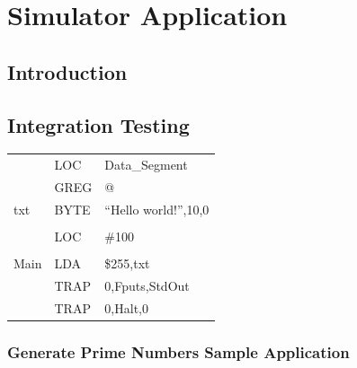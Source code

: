 \documentclass[a4paper,11pt]{report}
\begin{document}
\chapter{Simulator Application}
\section{Introduction}
\section{Integration Testing}
\begin{centering}
\begin{tabular}{ l l l }
 & LOC & Data\_Segment\\
 & GREG & @\\
txt & BYTE & ``Hello world!'',10,0\\
\\
 & LOC & \#100\\
\\
Main & LDA & \$255,txt\\
 & TRAP & 0,Fputs,StdOut\\
 & TRAP & 0,Halt,0\\
\end{tabular}
\end{centering}
\subsection{Generate Prime Numbers Sample Application}
\label{primenumbers}
\end{document}
